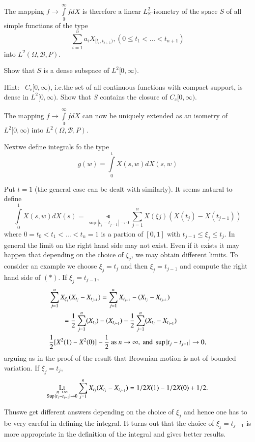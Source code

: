 \begin{remark*}
The mapping $f\to \int\limits^{\infty}_{0}fdX$ is therefore a linear
$L^{2}_{\mathbb{R}}$-isometry of the space $S$ of all simple functions
of the type
$$
\sum^{n}_{i=1}a_{i}X_{[t_{i},t_{i+1})},(0\leq t_{1}<\ldots<t_{n+1})
$$
into $L^{2}(\Omega,\mathscr{B},P)$.
\end{remark*}

\begin{exercise}\label{chap11-exer2}
Show that $S$ is a dense subspace of $L^{2}[0,\infty)$. 

\noindent
Hint:~ $C_{c}[0,\infty)$, i.e.\@ the set of all continuous functions
  with compact support, is dense in $L^{2}[0,\infty)$. Show that $S$
    contains the closure of $C_{c}[0,\infty)$.
\end{exercise}

\begin{remark*}
The mapping $f\to \int\limits^{\infty}_{0}fdX$ can now be uniquely
extended as an isometry of $L^{2}[0,\infty)$ into
  $L^{2}(\Omega,\mathscr{B},P)$. 

Next\pageoriginale we define integrals fo the type
$$
g(w)=\int\limits^{t}_{0}X(s,w)dX(s,w)
$$

Put $t=1$ (the general case can be dealt with similarly). It seems
natural to define
\begin{equation*}
\int\limits^{1}_{0}X(s,w)dX(s)=\Lt\limits_{\sup |t_{j}-t_{j-1}|\to
  0}\sum\limits^{n}_{j=1}X(\xi j)(X(t_{j})-X(t_{j-1}))\tag{*}
\end{equation*}
where $0=t_{0}<t_{1}<\ldots <t_{n}=1$ is a partion of $[0,1]$ with
$t_{j-1}\leq \xi_{j}\leq t_{j}$. In general the limit on the right
hand side may not exist. Even if it exists it may happen that
depending on the choice of $\xi_{j}$, we may obtain different
limits. To consider an example we choose $\xi_{j}=t_{j}$ and then
$\xi_{j}=t_{j-1}$ and compute the right hand side of $(*)$. If
$\xi_{j}=t_{j-1}$, 
\begin{align*}
&\sum\limits^{n}_{j=1}X_{\xi_{j}}(X_{t_{j}}-X_{t_{j-1}})=\sum\limits^{n}_{j=1}X_{t_{j-1}}-(X_{t_{j}}-X_{t_{j-1}})\\
&\qquad
  =\frac{1}{2}\sum\limits^{n}_{j=1}(X_{t_{j}})-(X_{t_{j-1}})-\frac{1}{2}\sum\limits^{n}_{j=1}(X_{t_{j}}-X_{t_{j-1}})\\
& \frac{1}{2}[X^{2}(1)-X^{2}(0)]-\frac{1}{2}\text{~ as~ } n\to \infty,
  \text{~ and~ } \sup |t_{j}-t_{j-1}|\to 0,
\end{align*}
arguing as in the proof of the result that Brownian motion is not of
bounded variation. If $\xi_{j}=t_{j}$,
$$
\operatorname*{Lt}\limits_{\substack{n\to \infty\\ \operatorname*{Sup} |t_{j}-t_{j-1}|\to 0}}\sum^{n}_{j=1}X_{t_{j}}(X_{t_{j}}-X_{t_{j-1}})=1/2X(1)-1/2X(0)+1/2.
$$

Thus\pageoriginale we get different answers depending on the choice of
$\xi_{j}$ and hence one has to be very careful in defining the
integral. It turns out that the choice of $\xi_{j}=t_{j-1}$ is more
appropriate in the definition of the integral and gives better results.
\end{remark*}

